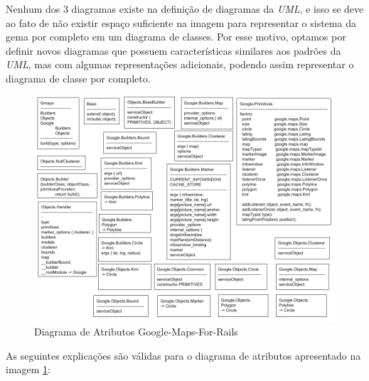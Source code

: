 Nenhum dos 3 diagramas existe na definição de diagramas da \emph{UML}, e isso se deve ao fato de não
existir espaço suficiente na imagem para representar o sistema da gema por completo em um diagrama de classes.
Por esse motivo, optamos por definir novos diagramas que possuem características similares aos padrões da
\emph{UML}, mas com algumas representações adicionais, podendo assim representar o diagrama de classe por
completo.


\begin{figure}[ht]
  \begin{center}
    \includegraphics[scale=0.35]{images/diagrama_de_atributos_google_maps_for_rails.png}
    \caption{Diagrama de Atributos Google-Maps-For-Rails}
    \label{fig:diagrama_de_atributos_google_maps_for_rails}
  \end{center}
\end{figure}


As seguintes explicações são válidas para o diagrama de atributos apresentado na imagem
\ref{fig:diagrama_de_atributos_google_maps_for_rails}:

